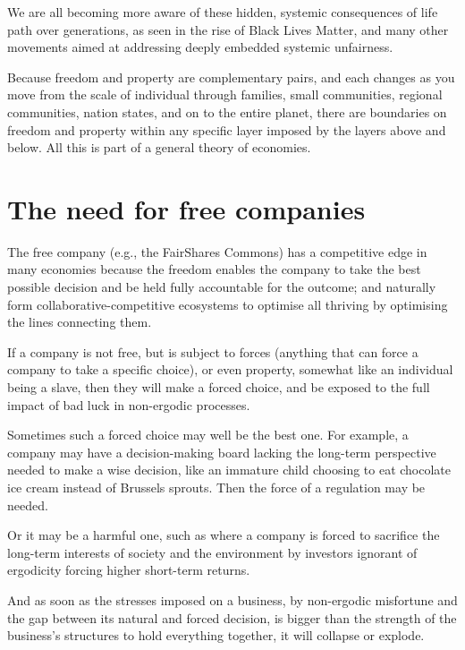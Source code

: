 We are all becoming more aware of these hidden, systemic consequences of life path over generations, as seen in the rise of Black Lives Matter, and many other movements aimed at addressing deeply embedded systemic unfairness.


Because freedom  and property are complementary pairs,  and each changes as you move from the scale of individual through families, small communities, regional communities, nation states, and on to the entire planet, there are boundaries on freedom and property within any specific layer imposed by the layers above and below. All this is part of a general theory of economies. 






\section{The need for free companies}
The free company (e.g., the FairShares Commons) has a competitive edge in many economies because the freedom enables the company to take the best possible decision and be held fully accountable for the outcome; and naturally form collaborative\hyp{}competitive ecosystems to optimise all thriving by optimising the lines connecting them.


If a company is not free, but is subject to forces (anything that can force a company to take a specific choice), or even property, somewhat like an individual being a slave, then they will make a forced choice, and be exposed to the full impact of bad luck in non-ergodic processes.


Sometimes such a forced choice may well be the best one. For example, a company may have a decision-making board lacking the long-term perspective needed to make a wise decision, like an immature child choosing to eat chocolate ice cream instead of Brussels sprouts. Then the force of a regulation may be needed.


Or it may be a harmful one, such as where a company is forced to sacrifice the long-term interests of society and the environment by investors ignorant of ergodicity forcing higher short-term returns. 


And as soon as the stresses imposed on a business, by non-ergodic misfortune and the gap between its natural and forced decision, is bigger than the strength of the business’s structures to hold everything together, it will collapse or explode.


